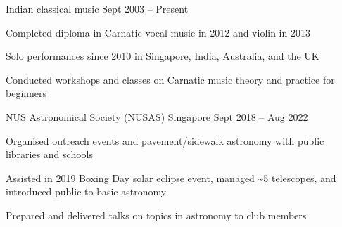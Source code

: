 \begin{cventries}
	{Indian classical music} %
	{} %
	{Sept 2003 -- Present} %
	{
		\begin{cvitems} %
			\item Completed diploma in Carnatic vocal music in 2012 and violin in 2013
			\item Solo performances since 2010 in Singapore, India, Australia, and the UK
			\item Conducted workshops and classes on Carnatic music theory and practice for beginners
		\end{cvitems}
	}

	{NUS Astronomical Society (NUSAS)} %
	{Singapore} %
	{Sept 2018 -- Aug 2022} %
	{
		\begin{cvitems} %
			\item Organised outreach events and pavement/sidewalk astronomy with public libraries and schools
			\item Assisted in 2019 Boxing Day solar eclipse event, managed \textasciitilde5 telescopes, and introduced public to basic astronomy
			\item Prepared and delivered talks on topics in astronomy to club members
		\end{cvitems}
	}

\end{cventries}

